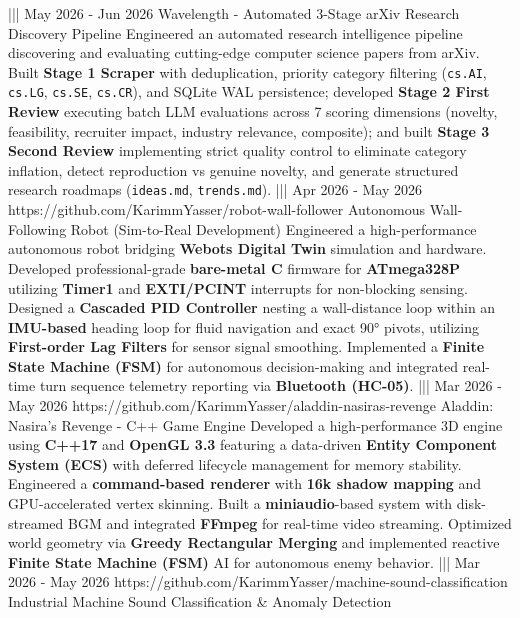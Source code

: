 {    |||
    {May 2026 - Jun 2026}%
    {}%
    {Wavelength - Automated 3-Stage arXiv Research Discovery Pipeline}%
    {Engineered an automated research intelligence pipeline discovering and evaluating cutting-edge computer science papers from arXiv. Built \textbf{Stage 1 Scraper} with deduplication, priority category filtering (\texttt{cs.AI}, \texttt{cs.LG}, \texttt{cs.SE}, \texttt{cs.CR}), and SQLite WAL persistence; developed \textbf{Stage 2 First Review} executing batch LLM evaluations across 7 scoring dimensions (novelty, feasibility, recruiter impact, industry relevance, composite); and built \textbf{Stage 3 Second Review} implementing strict quality control to eliminate category inflation, detect reproduction vs genuine novelty, and generate structured research roadmaps (\texttt{ideas.md}, \texttt{trends.md}).}%
    |||
    {Apr 2026 - May 2026}%
    {https://github.com/KarimmYasser/robot-wall-follower}%
    {Autonomous Wall-Following Robot (Sim-to-Real Development)}%
    {Engineered a high-performance autonomous robot bridging \textbf{Webots Digital Twin} simulation and hardware. Developed professional-grade \textbf{bare-metal C} firmware for \textbf{ATmega328P} utilizing \textbf{Timer1} and \textbf{EXTI/PCINT} interrupts for non-blocking sensing. Designed a \textbf{Cascaded PID Controller} nesting a wall-distance loop within an \textbf{IMU-based} heading loop for fluid navigation and exact 90° pivots, utilizing \textbf{First-order Lag Filters} for sensor signal smoothing. Implemented a \textbf{Finite State Machine (FSM)} for autonomous decision-making and integrated real-time turn sequence telemetry reporting via \textbf{Bluetooth (HC-05)}.}%
    |||
    {Mar 2026 - May 2026}%
    {https://github.com/KarimmYasser/aladdin-nasiras-revenge}%
    {Aladdin: Nasira's Revenge - C++ Game Engine}%
    {Developed a high-performance 3D engine using \textbf{C++17} and \textbf{OpenGL 3.3} featuring a data-driven \textbf{Entity Component System (ECS)} with deferred lifecycle management for memory stability. Engineered a \textbf{command-based renderer} with \textbf{16k shadow mapping} and GPU-accelerated vertex skinning. Built a \textbf{miniaudio}-based system with disk-streamed BGM and integrated \textbf{FFmpeg} for real-time video streaming. Optimized world geometry via \textbf{Greedy Rectangular Merging} and implemented reactive \textbf{Finite State Machine (FSM)} AI for autonomous enemy behavior.}%
    |||
    {Mar 2026 - May 2026}%
    {https://github.com/KarimmYasser/machine-sound-classification}%
    {Industrial Machine Sound Classification \& Anomaly Detection}%
}

